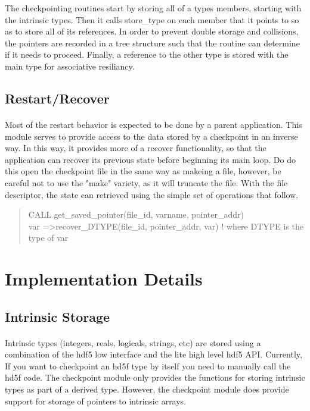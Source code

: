 \documentclass{article}
\begin{document}
The checkpointing routines start by storing all of a types members, starting with the intrinsic types. Then it calls store\_type on each member that it points to so as to store all of its references. In order to prevent double storage and collisions, the pointers are recorded in a tree structure such that the routine can determine if it needs to proceed. Finally, a reference to the other type is stored with the main type for associative resiliancy.

\subsection{Restart/Recover}
\paragraph{}
Most of the restart behavior is expected to be done by a parent application. This module serves to provide access to the data stored by a checkpoint in an inverse way. In this way, it provides more of a recover functionality, so that the application can recover its previous state before beginning its main loop. Do do this open the checkpoint file in the same way as makeing a file, however, be careful not to use the "make" variety, as it will truncate the file. With the file descriptor, the state can retrieved using the simple set of operations that follow.
\begin{quote}
   CALL get\_saved\_pointer(file\_id, varname, pointer\_addr) \\
   var =\textgreater recover\_DTYPE(file\_id, pointer\_addr, var) ! where DTYPE is the type of var
\end{quote}
\section{Implementation Details}
\subsection{Intrinsic Storage}
\paragraph{}
Intrinsic types (integers, reals, logicals, strings, etc) are stored using a combination of the hdf5 low interface and the lite high level hdf5 API. Currently, If you want to checkpoint an hd5f type by itself you need to manually call the hd5f code. The checkpoint module only provides the functions for storing intrinsic types as part of a derived type. However, the checkpoint module does provide support for storage of pointers to intrinsic arrays.
\end{document}
